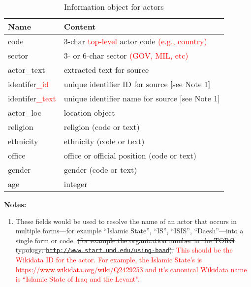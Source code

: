 \documentclass[11pt]{report}
\newcommand{\andy}[1]{\textcolor{red}{#1}}
\begin{document}
\begin{table}[htp]
\caption{Information object for actors }
\begin{center}
\begin{tabular}{|l|l|}
\hline
Name & Content \\
\hline
code & 3-char \andy{top-level} actor code \andy{(e.g., country)}\\
sector & 3- or 6-char sector \andy{(GOV, MIL, etc)}\\
actor\_text & extracted text for source \\
identifer\andy{\_id} & unique identifier ID for source [see Note 1]\\
identifer\andy{\_text} & unique identifier name for source [see Note 1]\\
actor\_loc & location object\\
religion & religion (code or text) \\
ethnicity & ethnicity (code or text) \\
office & office or official position (code or text) \\
gender & gender (code or text) \\
age & integer \\
\hline
\end{tabular}
\end{center}
\label{tab:actorinfo}
\noindent \textbf{Notes:}
\begin{enumerate}
\item These fields would be used to resolve the name of an actor that occurs in multiple forms---for example ``Islamic State'', ``IS'', ``ISIS'', ``Daesh''---into a single form or code. \sout{(for example the organization number in the TORG typology:  \texttt{http://www.start.umd.edu/using-baad}).} \andy{This should be the Wikidata ID for the actor. For example, the Islamic State's is https://www.wikidata.org/wiki/Q2429253 and it's canonical Wikidata name is ``Islamic State of Iraq and the Levant''.}
\end{enumerate}
\end{table}%
\end{document}
